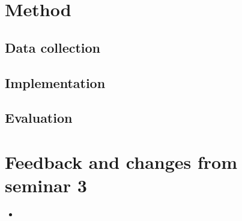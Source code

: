 \documentclass{sigchi}
\begin{document}
\section{Method}
\subsection{Data collection}
\subsection{Implementation}
\subsection{Evaluation}




\balance{}




\newpage
\appendix{}
\section{Feedback and changes from seminar 3}


\begin{itemize}
\item 
\end{itemize}
\end{document}
